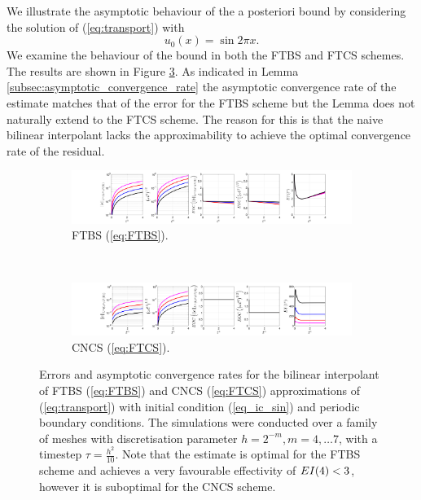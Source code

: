 \documentclass[final]{amsart}
\numberwithin{equation}{section}
\begin{document}
We illustrate the asymptotic behaviour of the a posteriori bound by
considering the solution of (\ref{eq:transport}) with
\begin{equation}
  \label{eq_ic_sin}
  u_0(x) = \sin{2\pi x}.
\end{equation}
We examine the behaviour of the bound in both the FTBS and FTCS
schemes. The results are shown in Figure
\ref{fig:bilinearLagrange}. As indicated in Lemma
\ref{subsec:asymptotic_convergence_rate} the asymptotic convergence
rate of the estimate matches that of the error for the FTBS scheme but
the Lemma does not naturally extend to the FTCS scheme. The reason for
this is that the naive bilinear interpolant lacks the approximability
to achieve the optimal convergence rate of the residual.
\begin{figure}[H]
	\begin{subfigure}[b]{\textwidth}
		\includegraphics[width=\textwidth]{../figures/fig_FTBSplots_1x5_sin_IC_ind_uniform_P1}	
		\caption{
			\label{sfig:FTBS_prelim}
			FTBS (\ref{eq:FTBS}).
		}
	\end{subfigure}
	\\
	\begin{subfigure}[b]{\textwidth}
		\includegraphics[width=\textwidth]{../figures/fig_CNCS_plots_1x5_sin_IC_ind_uniform_P1}	
		\caption{\label{sfig:FTCS_prelim_P1}
			CNCS (\ref{eq:FTCS}).
		}
	\end{subfigure}
	\caption{\label{fig:bilinearLagrange} Errors and asymptotic
          convergence rates for the bilinear interpolant of FTBS
          (\ref{eq:FTBS}) and CNCS (\ref{eq:FTCS}) approximations of
          (\ref{eq:transport}) with initial condition
          (\ref{eq_ic_sin}) and periodic boundary conditions. The
          simulations were conducted over a family of meshes with
          discretisation parameter $h = 2^{-m}, m = 4,\dots 7$, with a
          timestep $\tau = \tfrac{h^2}{10}$. Note that the estimate is
          optimal for the FTBS scheme and achieves a very favourable
          effectivity of $EI \!\left({4}\right) < 3$, however it is suboptimal for
          the CNCS scheme.  }
\end{figure}
\end{document}
